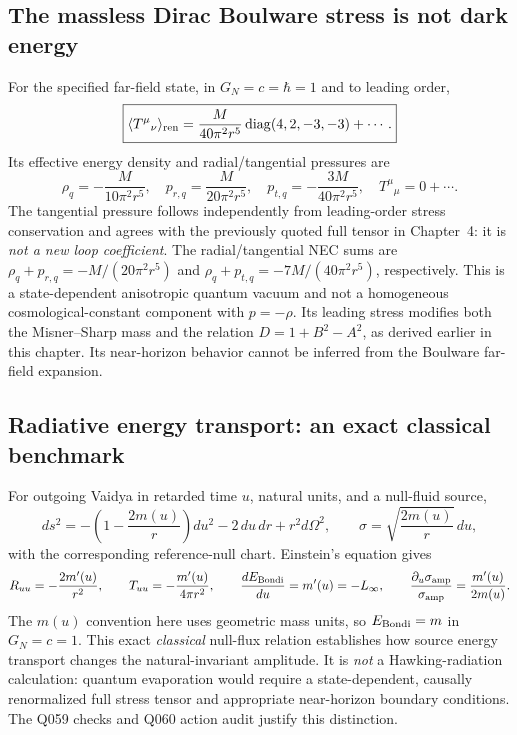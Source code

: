 \documentclass[11pt,a4paper]{article}
\theoremstyle{definition}\newtheorem{definition}[theorem]{Definition}
\theoremstyle{remark}\newtheorem{remark}[theorem]{Remark}
\begin{document}
\subsection{The massless Dirac Boulware stress is not dark energy}
For the specified far-field state, in $G_N=c=\hbar=1$ and to leading order,
\begin{equation}\label{eq:q061-ch7-stress}
\boxed{\langle T^\mu{}_{\nu}\rangle_{\rm ren}
=\frac{M}{40\pi^2r^5}\operatorname{diag}(4,2,-3,-3)+\cdots.}
\end{equation}
Its effective energy density and radial/tangential pressures are
\begin{equation}
\rho_q=-\frac{M}{10\pi^2r^5},\quad
p_{r,q}=\frac{M}{20\pi^2r^5},\quad
p_{t,q}=-\frac{3M}{40\pi^2r^5},\quad
T^\mu{}_{\mu}=0+\cdots .
\end{equation}
The tangential pressure follows independently from leading-order stress conservation and agrees with the previously quoted full tensor in Chapter~4: it is \emph{not a new loop coefficient}. The radial/tangential NEC sums are $\rho_q+p_{r,q}=-M/(20\pi^2r^5)$ and $\rho_q+p_{t,q}=-7M/(40\pi^2r^5)$, respectively. This is a state-dependent anisotropic quantum vacuum and not a homogeneous cosmological-constant component with $p=-\rho$. Its leading stress modifies both the Misner--Sharp mass and the relation $D=1+B^2-A^2$, as derived earlier in this chapter. Its near-horizon behavior cannot be inferred from the Boulware far-field expansion.

\subsection{Radiative energy transport: an exact classical benchmark}
For outgoing Vaidya in retarded time $u$, natural units, and a null-fluid source,
\begin{equation}\label{eq:q061-ch7-vaidya}
 ds^2=-\left(1-\frac{2m(u)}r\right)du^2-2\,du\,dr+r^2d\Omega^2,
 \qquad \sigma=\sqrt{\frac{2m(u)}r}\,du,
\end{equation}
with the corresponding reference-null chart. Einstein's equation gives
\begin{equation}
R_{uu}=-\frac{2m'(u)}{r^2},\qquad
T_{uu}=-\frac{m'(u)}{4\pi r^2},\qquad
\frac{dE_{\rm Bondi}}{du}=m'(u)=-L_\infty,
\qquad
\frac{\partial_u\sigma_{\rm amp}}{\sigma_{\rm amp}}=\frac{m'(u)}{2m(u)}.
\end{equation}
The $m(u)$ convention here uses geometric mass units, so $E_{\rm Bondi}=m$ in $G_N=c=1$. This exact \emph{classical} null-flux relation establishes how source energy transport changes the natural-invariant amplitude. It is \emph{not} a Hawking-radiation calculation: quantum evaporation would require a state-dependent, causally renormalized full stress tensor and appropriate near-horizon boundary conditions. The Q059 checks and Q060 action audit justify this distinction.
\end{document}
